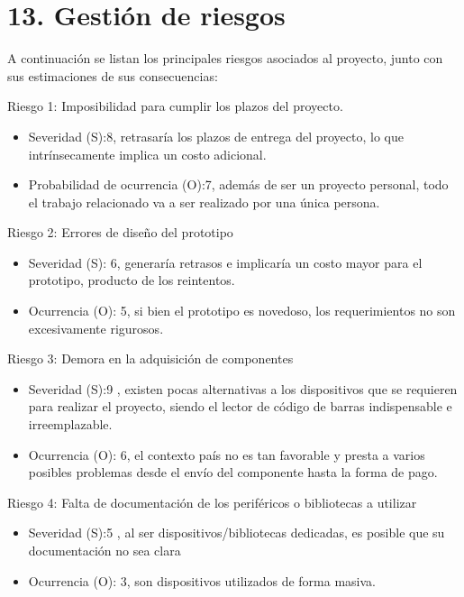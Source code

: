 \documentclass[
11pt, %
codirector, %
]{charter}
\begin{document}
\section{13. Gestión de riesgos}
\label{sec:riesgos}

A continuación se listan los principales riesgos asociados al proyecto, junto con sus estimaciones de sus consecuencias:
 
Riesgo 1: Imposibilidad para cumplir los plazos del proyecto.
\begin{itemize}
	\item Severidad (S):8, retrasaría los plazos de entrega del proyecto, lo que intrínsecamente implica un costo adicional.\\
	\item Probabilidad de ocurrencia (O):7, además de ser un proyecto personal, todo el trabajo relacionado va a ser realizado por una única persona.\\
\end{itemize}   

Riesgo 2: Errores de diseño del prototipo
\begin{itemize}
	\item Severidad (S): 6, generaría retrasos e implicaría un costo mayor para el prototipo, producto de los reintentos.
	\item Ocurrencia (O): 5, si bien el prototipo es novedoso, los requerimientos no son excesivamente rigurosos.
\end{itemize}

Riesgo 3: Demora en la adquisición de componentes
\begin{itemize}
	\item Severidad (S):9 , existen pocas alternativas a los dispositivos que se requieren para realizar el proyecto, siendo el lector de código de barras indispensable e irreemplazable.
	\item Ocurrencia (O): 6, el contexto país no es tan favorable y presta a varios posibles problemas desde el envío del componente hasta la forma de pago.
\end{itemize}

Riesgo 4: Falta de documentación de los periféricos o bibliotecas a utilizar
\begin{itemize}
	\item Severidad (S):5 , al ser dispositivos/bibliotecas dedicadas, es posible que su documentación no sea clara
	\item Ocurrencia (O): 3, son dispositivos utilizados de forma masiva.
\end{itemize}
\end{document}
